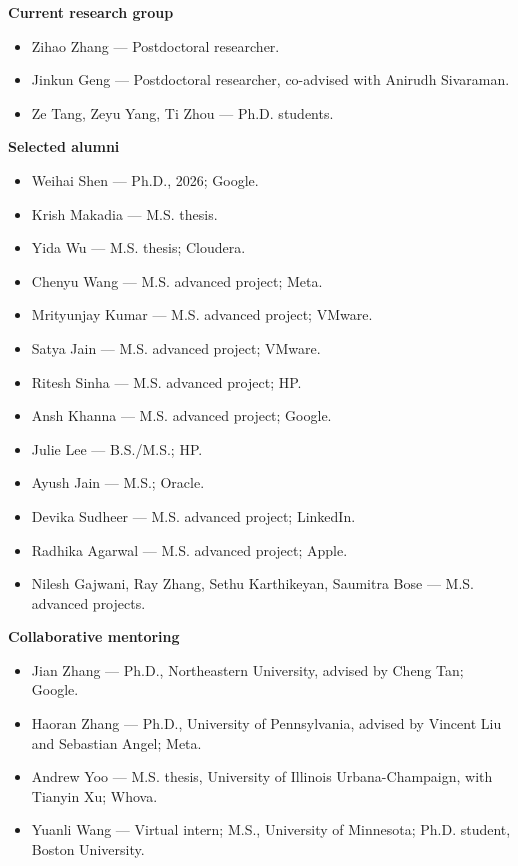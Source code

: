 \documentclass[10pt,letterpaper]{article}
\newcommand{\cvsection}[1]{\Needspace{4\baselineskip}\vspace{8pt}{\large\bfseries #1}\par\vspace{3pt}}
\begin{document}
\cvsection{Advising and Mentoring}
\textbf{Current research group}\par
\begin{itemize}
\item Zihao Zhang --- Postdoctoral researcher.
\item Jinkun Geng --- Postdoctoral researcher, co-advised with Anirudh Sivaraman.
\item Ze Tang, Zeyu Yang, Ti Zhou --- Ph.D. students.
\end{itemize}
\vspace{5pt}
\textbf{Selected alumni}\par
\begin{itemize}
\item Weihai Shen --- Ph.D., 2026; Google.
\item Krish Makadia --- M.S. thesis.
\item Yida Wu --- M.S. thesis; Cloudera.
\item Chenyu Wang --- M.S. advanced project; Meta.
\item Mrityunjay Kumar --- M.S. advanced project; VMware.
\item Satya Jain --- M.S. advanced project; VMware.
\item Ritesh Sinha --- M.S. advanced project; HP.
\item Ansh Khanna --- M.S. advanced project; Google.
\item Julie Lee --- B.S./M.S.; HP.
\item Ayush Jain --- M.S.; Oracle.
\item Devika Sudheer --- M.S. advanced project; LinkedIn.
\item Radhika Agarwal --- M.S. advanced project; Apple.
\item Nilesh Gajwani, Ray Zhang, Sethu Karthikeyan, Saumitra Bose --- M.S. advanced projects.
\end{itemize}
\vspace{5pt}
\textbf{Collaborative mentoring}\par
\begin{itemize}
\item Jian Zhang --- Ph.D., Northeastern University, advised by Cheng Tan; Google.
\item Haoran Zhang --- Ph.D., University of Pennsylvania, advised by Vincent Liu and Sebastian Angel; Meta.
\item Andrew Yoo --- M.S. thesis, University of Illinois Urbana-Champaign, with Tianyin Xu; Whova.
\item Yuanli Wang --- Virtual intern; M.S., University of Minnesota; Ph.D. student, Boston University.
\end{itemize}
\end{document}
